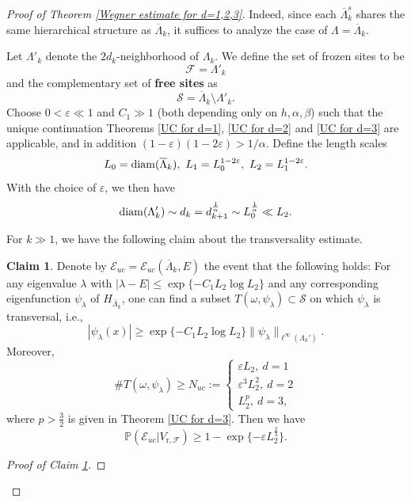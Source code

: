 \documentclass[11pt,reqno,UTF8,twoside]{amsart}
\newcommand{\barLambda}{\overline{\Lambda}}
\renewcommand{\P}{\mathbb{P}}
\newcommand{\mcE}{\mathcal{E}}
\newcommand{\mcF}{\mathcal{F}}
\newcommand{\mcS}{\mathcal{S}}
\newcommand{\diam}{{\rm diam}}
\theoremstyle{definition}
\newtheorem{claim}[thm]{\bf Claim}
\numberwithin{equation}{section}
\begin{document}
\begin{proof}[Proof of Theorem \ref{Wegner estimate for d=1,2,3}]
Indeed, since  each  $\overline{\Lambda}_k^s$ shares  the same hierarchical structure as $\overline{\Lambda}_k$, it  suffices  to analyze the case of  $\Lambda= \overline{\Lambda}_k$. 

Let $\Lambda'_k$ denote the $2d_k$-neighborhood of $\Lambda_k$. We define the set of frozen sites  to be  $$\mcF = \Lambda'_k$$ and the complementary set of {\bf free sites}  as $$\mcS = \barLambda_k \setminus \Lambda'_k.$$ 
Choose $0<\varepsilon \ll1$   and $C_1 \gg1$  (both  depending only on $h, \alpha, \beta$) such that the unique continuation Theorems \ref{UC for d=1}, \ref{UC for d=2} and \ref{UC for d=3} are applicable, and  in addition $(1-\varepsilon)(1-2\varepsilon) > 1/\alpha$. Define the length scales
\[L_0=\diam(\barLambda_k),\ L_1=L_0^{1-2\varepsilon},\ L_2=L_1^{1-2\varepsilon}.\]
With the  choice of $\varepsilon$,  we then have
\begin{equation}\label{DS20 scale relationship}
  \diam(\Lambda_k')\sim d_k=d_{k+1}^{\frac{1}{\alpha}}\sim L_0^{\frac{1}{\alpha}}\ll L_2. 
\end{equation}

For  $k\gg1$, we have the following claim about the transversality estimate.
\begin{claim}\label{Claim UC}
Denote by $\mcE_{uc}=\mcE_{uc}(\barLambda_k, E)$ the event that the following holds: For any eigenvalue $\lambda$ with $|\lambda - E| \leq \exp\{-C_1 L_2 \log L_2\}$ and any corresponding eigenfunction $\psi_{\lambda}$ of $H_{\barLambda_k}$, one can find a subset $T(\omega, \psi_{\lambda}) \subset \mcS$ on which $\psi_{\lambda}$ is transversal, i.e.,
\[|\psi_{\lambda}(x)|\geq \exp\{-C_1L_2\log L_2\}\|\psi_{\lambda}\|_{\ell^{\infty}(\Lambda_k')} .\]
Moreover,
\begin{equation}\label{rho Sperner}
  \# T(\omega,\psi_\lambda)\geq N_{uc}:= 
  \begin{cases}
    \varepsilon L_2, \ d=1\\
    \varepsilon^3 L^2_2, \ d=2\\
     L_2^{p}, \ d=3,
  \end{cases}
\end{equation}
where $p>\frac{3}{2}$ is given in Theorem \ref{UC for d=3}. 
Then we have %
\[\P(\mcE_{uc}|V_{\text{r},\mcF })\geq 1-\exp\{-\varepsilon L^{\frac{2}{3}}_2\}.\]
\end{claim}
\begin{proof}[Proof of Claim \ref{Claim UC}]
  


\end{proof}
\end{proof}
\end{document}
